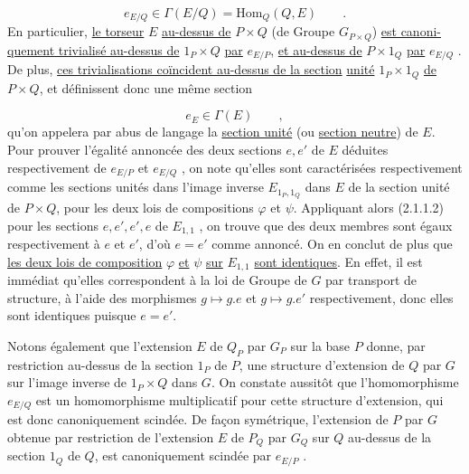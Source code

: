 \begin{equation}\tag{2.2.2}
e_{E/Q} \in \Gamma(E/Q) = \mathrm{Hom}_Q(Q,E) \qquad .
\end{equation}
En particulier, \underline{le torseur} $E$ \underline{au-dessus de} $P\times Q$ (de Groupe $G_{P\times Q}$) \underline{est canoni-}
\underline{quement trivialisé au-dessus de} $1_P\times Q$ \underline{par} $e_{E/P}$, \underline{et au-dessus de} $P \times 1_Q$ \underline{par}
$e_{E/Q}$ . De plus, \underline{ces trivialisations coïncident au-dessus de la section}
\underline{unité} $1_P\times 1_Q$ \underline{de} $P\times Q$, et définissent donc une même section 


\begin{equation}\tag{2.2.3}
 e_{E} \in \Gamma(E) \qquad ,
\end{equation}
qu'on appelera par abus de langage la \underline{section unité} (ou \underline{section neutre}) de $E$. Pour prouver l'égalité annoncée des deux sections $e,e'$ de $E$ déduites respectivement de $e_{E/P}$ et $e_{E/Q}$ , on note qu'elles sont caractérisées respectivement comme les sections unités dans l'image inverse $E_{1_{P},1_{Q}}$ dans $E$ de la section unité de $P\times Q$, pour les deux lois de compositions $\varphi$ et $\psi$. Appliquant alors (2.1.1.2) pour les sections $e,e',e',e$ de $E_{1,1}$ , on trouve que des deux membres sont égaux respectivement à $e$ et $e'$, d'où $e=e'$ comme annoncé. On en conclut de plus que \underline{les deux lois de composition} $\varphi$ \underline{et} $\psi$ \underline{sur} $E_{1,1}$ \underline{sont identiques}. En effet, il est immédiat qu'elles correspondent à la loi de Groupe de $G$ par transport de structure, à l'aide des morphismes $g \longmapsto g.e$ et $g \longmapsto g.e'$ respectivement, donc elles sont identiques puisque $e=e'$.

Notons également que l'extension $E$ de $Q_{P}$ par $G_{P}$ sur la base $P$ donne, par restriction au-dessus de la section $1_{P}$ de $P$, une structure d'extension de $Q$ par $G$ sur l'image inverse de $1_{P}\times Q$ dans $G$. On constate aussitôt que l'homomorphisme $e_{E/Q}$ est un homomorphisme multiplicatif pour cette structure d'extension, qui est donc canoniquement scindée. De façon symétrique, l'extension de $P$ par $G$ obtenue par restriction de l'extension $E$ de $P_{Q}$ par $G_{Q}$ sur $Q$ au-dessus de la section $1_{Q}$ de $Q$, est canoniquement scindée par $e_{E/P}$ .



